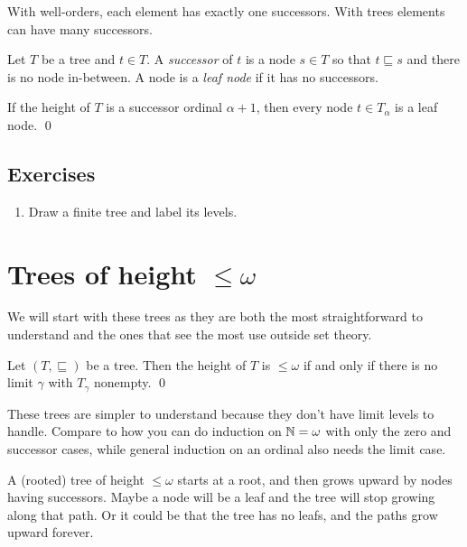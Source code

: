 \documentclass[10pt]{amsart}
\begin{document}
With well-orders, each element has exactly one successors. With trees elements can have many successors.
\begin{definition}
Let $T$ be a tree and $t \in T$. A \emph{successor} of $t$ is a node $s \in T$ so that $t \sqsubseteq s$ and there is no node in-between. A node is a \emph{leaf node} if it has no successors.
\end{definition}

\begin{observation}
If the height of $T$ is a successor ordinal $\alpha+1$, then every node $t \in T_\alpha$ is a leaf node. \qed
\end{observation}



\subsection*{Exercises}

\begin{enumerate}
\item Draw a finite tree and label its levels.
\end{enumerate}

\newpage

\section{Trees of height $\le \omega$}

We will start with these trees as they are both the most straightforward to understand and the ones that see the most use outside set theory.

\begin{observation}
Let $(T,\sqsubseteq)$ be a tree. Then the height of $T$ is $\le \omega$ if and only if there is no limit $\gamma$ with $T_\gamma$ nonempty. \qed
\end{observation}

These trees are simpler to understand because they don't have limit levels to handle. Compare to how you can do induction  on $\mathbb{N} = \omega$ with only the zero and successor cases, while general induction on an ordinal also needs the limit case.


A (rooted) tree of height $\le \omega$ starts at a root, and then grows upward by nodes having successors. Maybe a node will be a leaf and the tree will stop growing along that path. Or it could be that the tree has no leafs, and the paths grow upward forever.
\end{document}
